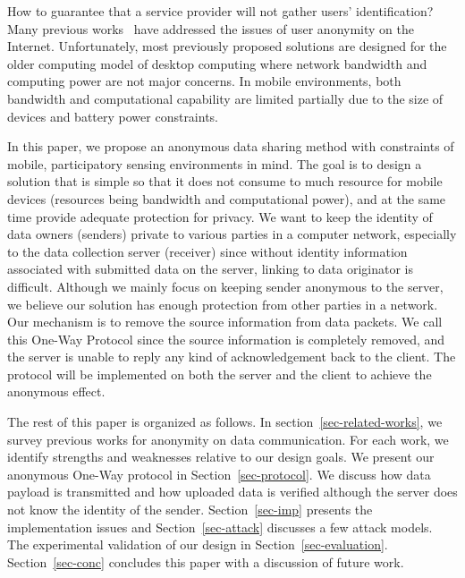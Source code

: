 How to guarantee that a service provider will not gather users'
identification? Many previous
works~\cite{DBLP:conf/uss/DingledineMS04,DBLP:journals/cacm/ReiterR99,
DBLP:journals/jcs/LevineS02} have addressed the issues of user
anonymity on the Internet. Unfortunately, most previously proposed
solutions are designed for the older computing model of desktop
computing where network bandwidth and computing power are not
major concerns. In mobile environments, both bandwidth and
computational capability are limited partially due to the size of
devices and battery power constraints.

In this paper, we propose an anonymous data sharing method with
constraints of mobile, participatory sensing environments in mind.
The goal is to design a solution that is simple so that it does
not consume to much resource for mobile devices (resources being
bandwidth and computational power), and at the same time provide
adequate protection for privacy. We want to keep the identity of
data owners (senders) private to various parties in a computer
network, especially to the data collection server (receiver) since
without identity information associated with submitted data on the
server, linking to data originator is difficult. Although we
mainly focus on keeping sender anonymous to the server, we believe
our solution has enough protection from other parties in a
network. Our mechanism is to remove the source information from
data packets. We call this One-Way Protocol since the source
information is completely removed, and the server is unable to
reply any kind of acknowledgement back to the client. The protocol
will be implemented on both the server and the client to achieve
the anonymous effect.

The rest of this paper is organized as follows. In
section~\ref{sec-related-works}, we survey previous works for
anonymity on data communication. For each work, we identify
strengths and weaknesses relative to our design goals. We present
our anonymous One-Way protocol in Section~\ref{sec-protocol}. We
discuss how data payload is transmitted and how uploaded data is
verified although the server does not know the identity of the
sender. Section~\ref{sec-imp} presents the implementation issues
and Section~\ref{sec-attack} discusses a few attack models. The
experimental validation of our design in
Section~\ref{sec-evaluation}. Section~\ref{sec-conc} concludes
this paper with a discussion of future work.
